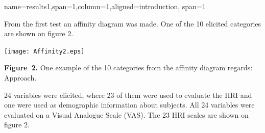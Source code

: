 \documentclass[paperwidth=118cm,paperheight=84cm,landscape,fontscale=0.2941]{baposter}
\begin{document}
\begin{poster}
{%


}


{name=results1,span=1,column=1,aligned=introduction, span=1}
{\parskip 5pt 
From the first test an affinity diagram was made. One of the 10 elicited categories are shown on figure 2.
\vspace{-10pt}  
\begin{center}
	\texttt{[image: Affinity2.eps]}
	
	\textbf{Figure~2. }\footnotesize{One example of the 10 categories from the affinity diagram regards: Approach.}
\end{center}
\vspace{-10pt}  
24 variables were elicited, where 23 of them were used to evaluate the HRI and one were used as demographic information about subjects. All 24 variables were evaluated on a Visual Analogue Scale (VAS). The 23 HRI scales are shown on figure 2.
  
}
\end{poster}
\end{document}
